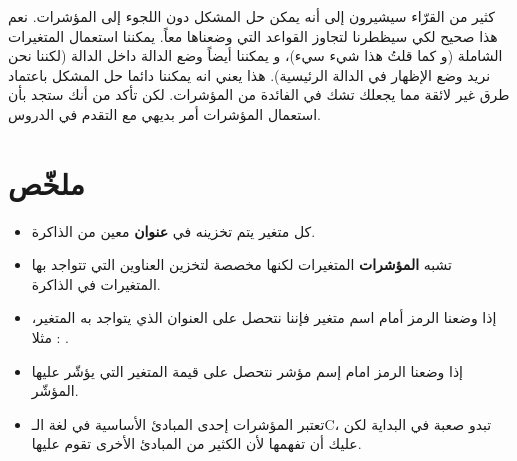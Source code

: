\begin{information}
	كثير من القرّاء سيشيرون إلى أنه يمكن حل المشكل دون اللجوء إلى المؤشرات. نعم هذا صحيح لكي سيظطرنا لتجاوز القواعد التي وضعناها معاً. يمكننا استعمال المتغيرات الشاملة (و كما قلتُ هذا شيء سيء)، و يمكننا أيضاً وضع الدالة
داخل الدالة
(لكننا نحن نريد وضع الإظهار في الدالة الرئيسية). هذا يعني انه يمكننا دائما حل المشكل باعتماد طرق غير لائقة مما يجعلك تشك في الفائدة من المؤشرات. لكن تأكد من أنك ستجد بأن استعمال المؤشرات أمر بديهي مع التقدم في الدروس.
\end{information}

\section*{ملخّص}
\begin{itemize}
	\item كل متغير يتم تخزينه في
\textbf{عنوان}
معين من الذاكرة.
	\item تشبه
\textbf{المؤشرات}
المتغيرات لكنها مخصصة لتخزين العناوين التي تتواجد بها المتغيرات في الذاكرة.
	\item إذا وضعنا الرمز
\InlineCode{\&}
أمام اسم متغير فإننا نتحصل على العنوان الذي يتواجد به المتغير، مثلا :
.
	\item إذا وضعنا الرمز
\InlineCode{*}
امام إسم مؤشر نتحصل على قيمة المتغير التي يؤشّر عليها المؤشّر.
	\item تعتبر المؤشرات إحدى المبادئ الأساسية في لغة الـ\textenglish{C}، تبدو صعبة في البداية لكن عليك أن تفهمها لأن الكثير من المبادئ الأخرى تقوم عليها.
\end{itemize}

